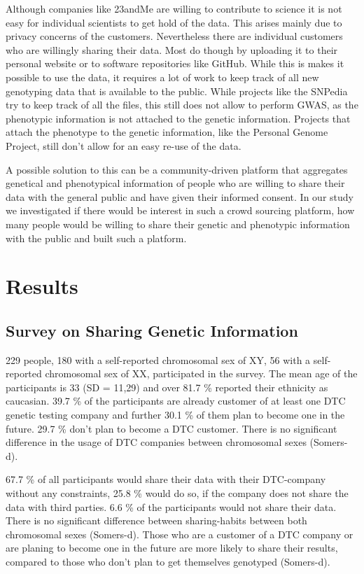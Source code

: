 \documentclass[10pt]{article}
\begin{document}
Although companies like 23andMe are willing to contribute to science it is not easy for individual scientists to get hold of the data. This arises mainly due to privacy concerns of the customers. Nevertheless there are individual customers who are willingly sharing their data. Most do though by uploading it to their personal website or to software repositories like GitHub. While this is makes it possible to use the data, it requires a lot of work to keep track of all new genotyping data that is available to the public. While projects like the SNPedia try to keep track of all the files, this still does not allow to perform GWAS, as the phenotypic information is not attached to the genetic information. Projects that attach the phenotype to the genetic information, like the Personal Genome Project, still don't allow for an easy re-use of the data.  

A possible solution to this can be a community-driven platform that aggregates genetical and phenotypical information of people who are willing to share their data with the general public and have given their informed consent. In our study we investigated if there would be interest in such a crowd sourcing platform, how many people would be willing to share their genetic and phenotypic information with the public and built such a platform. 

\section*{Results}

\subsection*{Survey on Sharing Genetic Information}
229 people, 180 with a self-reported chromosomal sex of XY, 56 with a self-reported chromosomal sex of XX, participated in the survey. The mean age of the participants is 33 (SD = 11,29) and over 81.7 \% reported their ethnicity as caucasian. 39.7 \% of the participants are already customer of at least one DTC genetic testing company and further 30.1 \% of them plan to become one in the future. 29.7 \% don't plan to become a DTC customer. There is no significant difference in the usage of DTC companies between chromosomal sexes (Somers-d). 

67.7 \% of all participants would share their data with their DTC-company without any constraints, 25.8 \% would do so, if the company does not share the data with third parties. 6.6 \% of the participants would not share their data. There is no significant difference between sharing-habits between both chromosomal sexes (Somers-d). Those who are a customer of a DTC company or are planing to become one in the future are more likely to share their results, compared to those who don't plan to get themselves genotyped (Somers-d). 
\end{document}
